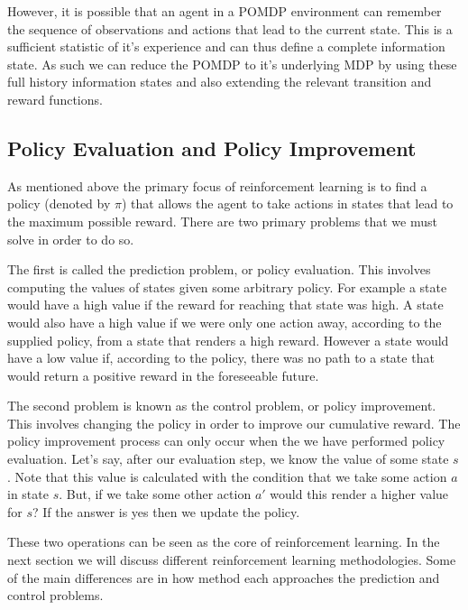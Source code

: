 However, it is possible that an agent in a POMDP environment can remember the sequence of observations
and actions that lead to the current state.
This is a sufficient statistic of it's experience and can thus define a complete information
state\citep{heinrich2017reinforcement}.
As such we can reduce the POMDP to it's underlying MDP by using these full history information
states and also extending the relevant transition and reward functions.


\subsection{Policy Evaluation and Policy Improvement}\label{subsec:policyEvalPolicyImp}
As mentioned above the primary focus of reinforcement learning is to find a policy (denoted by $\pi$) that allows
the agent to take actions in states that lead to the maximum possible reward.
There are two primary problems that we must solve in order to do so.

The first is called the prediction problem, or policy evaluation.
This involves computing the values of states given some arbitrary policy\citep{sutton1998reinforcement}.
For example a state would have a high value if the reward for reaching that state was high.
A state would also have a high value if we were only one action away, according to the supplied policy,
from a state that renders a high reward.
However a state would have a low value if, according to the policy, there was no path to a state that
would return a positive reward in the foreseeable future.

The second problem is known as the control problem, or policy improvement.
This involves changing the policy in order to improve our cumulative reward.
The policy improvement process can only occur when the we have performed policy evaluation.
Let's say, after our evaluation step, we know the value of some state $s$.
Note that this value is calculated with the condition that we take some action $a$ in state $s$.
But, if we take some other action $a'$ would this render a higher value for $s$?
If the answer is yes then we update the policy.

These two operations can be seen as the core of reinforcement learning.
In the next section we will discuss different reinforcement learning methodologies.
Some of the main differences are in how method each approaches the prediction and control problems.

